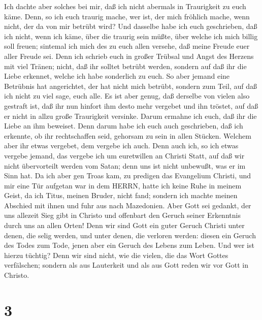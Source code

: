  Ich dachte aber solches bei mir, daß ich nicht abermals in
Traurigkeit zu euch käme.  Denn, so ich euch traurig mache,
wer ist, der mich fröhlich mache, wenn nicht, der da von mir betrübt
wird?  Und dasselbe habe ich euch geschrieben, daß ich
nicht, wenn ich käme, über die traurig sein müßte, über welche ich mich
billig soll freuen; sintemal ich mich des zu euch allen versehe, daß
meine Freude euer aller Freude sei.  Denn ich schrieb euch
in großer Trübsal und Angst des Herzens mit viel Tränen; nicht, daß ihr
solltet betrübt werden, sondern auf daß ihr die Liebe erkennet, welche
ich habe sonderlich zu euch.  So aber jemand eine Betrübnis
hat angerichtet, der hat nicht mich betrübt, sondern zum Teil, auf daß
ich nicht zu viel sage, euch alle.  Es ist aber genug, daß
derselbe von vielen also gestraft ist,  daß ihr nun hinfort
ihm desto mehr vergebet und ihn tröstet, auf daß er nicht in allzu große
Traurigkeit versinke.  Darum ermahne ich euch, daß ihr die
Liebe an ihm beweiset.  Denn darum habe ich euch auch
geschrieben, daß ich erkennte, ob ihr rechtschaffen seid, gehorsam zu
sein in allen Stücken.  Welchem aber ihr etwas vergebet,
dem vergebe ich auch. Denn auch ich, so ich etwas vergebe jemand, das
vergebe ich um euretwillen an Christi Statt,  auf daß wir
nicht übervorteilt werden vom Satan; denn uns ist nicht unbewußt, was er
im Sinn hat.  Da ich aber gen Troas kam, zu predigen das
Evangelium Christi, und mir eine Tür aufgetan war in dem HERRN,
 hatte ich keine Ruhe in meinem Geist, da ich Titus, meinen
Bruder, nicht fand; sondern ich machte meinen Abschied mit ihnen und
fuhr aus nach Mazedonien.  Aber Gott sei gedankt, der uns
allezeit Sieg gibt in Christo und offenbart den Geruch seiner Erkenntnis
durch uns an allen Orten!  Denn wir sind Gott ein guter
Geruch Christi unter denen, die selig werden, und unter denen, die
verloren werden:  diesen ein Geruch des Todes zum Tode,
jenen aber ein Geruch des Lebens zum Leben. Und wer ist hierzu tüchtig?
 Denn wir sind nicht, wie die vielen, die das Wort Gottes
verfälschen; sondern als aus Lauterkeit und als aus Gott reden wir vor
Gott in Christo.

\hypertarget{section-2}{%
\section{3}\label{section-2}}

